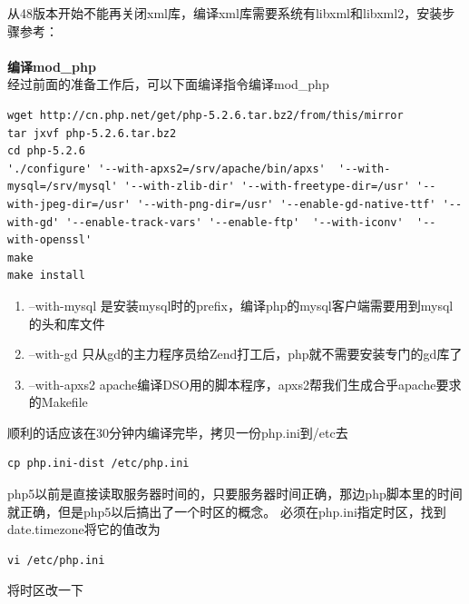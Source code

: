 \documentclass{article}
\begin{document}
从48版本开始不能再关闭xml库，编译xml库需要系统有libxml和libxml2，安装步骤参考：



\paragraph{}\textbf{编译mod\_php}\\

经过前面的准备工作后，可以下面编译指令编译mod\_php

\begin{verbatim}
wget http://cn.php.net/get/php-5.2.6.tar.bz2/from/this/mirror
tar jxvf php-5.2.6.tar.bz2
cd php-5.2.6
'./configure' '--with-apxs2=/srv/apache/bin/apxs'  '--with-mysql=/srv/mysql' '--with-zlib-dir' '--with-freetype-dir=/usr' '--with-jpeg-dir=/usr' '--with-png-dir=/usr' '--enable-gd-native-ttf' '--with-gd' '--enable-track-vars' '--enable-ftp'  '--with-iconv'  '--with-openssl' 
make
make install
\end{verbatim}
\begin{enumerate}
\item --with-mysql                是安装mysql时的prefix，编译php的mysql客户端需要用到mysql的头和库文件
\item --with-gd                        只从gd的主力程序员给Zend打工后，php就不需要安装专门的gd库了
\item --with-apxs2                apache编译DSO用的脚本程序，apxs2帮我们生成合乎apache要求的Makefile
\end{enumerate}

顺利的话应该在30分钟内编译完毕，拷贝一份php.ini到/etc去

\begin{verbatim}
cp php.ini-dist /etc/php.ini
\end{verbatim}
php5以前是直接读取服务器时间的，只要服务器时间正确，那边php脚本里的时间就正确，但是php5以后搞出了一个时区的概念。   必须在php.ini指定时区，找到date.timezone将它的值改为 

\begin{verbatim}
vi /etc/php.ini
\end{verbatim}
将时区改一下
\end{document}
